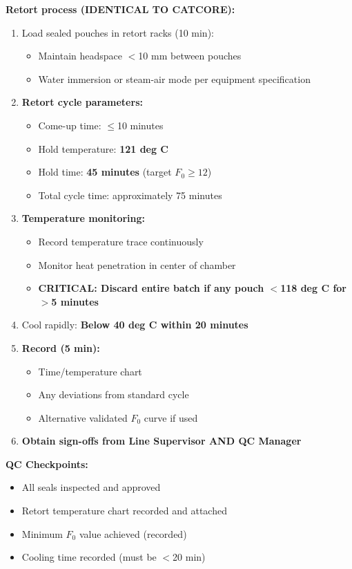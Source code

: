 \textbf{Retort process (IDENTICAL TO CATCORE):}
\begin{enumerate}[resume,leftmargin=1.5em]
\item Load sealed pouches in retort racks (10 min):
  \begin{itemize}
  \item Maintain headspace $<$10 mm between pouches
  \item Water immersion or steam-air mode per equipment specification
  \end{itemize}
\item \textbf{Retort cycle parameters:}
  \begin{itemize}
  \item Come-up time: $\le$10 minutes
  \item Hold temperature: \textbf{121 deg C}
  \item Hold time: \textbf{45 minutes} (target $F_0 \ge 12$)
  \item Total cycle time: approximately 75 minutes
  \end{itemize}
\item \textbf{Temperature monitoring:}
  \begin{itemize}
  \item Record temperature trace continuously
  \item Monitor heat penetration in center of chamber
  \item \textbf{CRITICAL: Discard entire batch if any pouch $<$118 deg C for $>$5 minutes}
  \end{itemize}
\item Cool rapidly: \textbf{Below 40 deg C within 20 minutes}
\item \textbf{Record (5 min):}
  \begin{itemize}
  \item Time/temperature chart
  \item Any deviations from standard cycle
  \item Alternative validated $F_0$ curve if used
  \end{itemize}
\item \textbf{Obtain sign-offs from Line Supervisor AND QC Manager}
\end{enumerate}

\textbf{QC Checkpoints:}
\begin{itemize}
\item All seals inspected and approved
\item Retort temperature chart recorded and attached
\item Minimum $F_0$ value achieved (recorded)
\item Cooling time recorded (must be $<$20 min)
\end{itemize}

